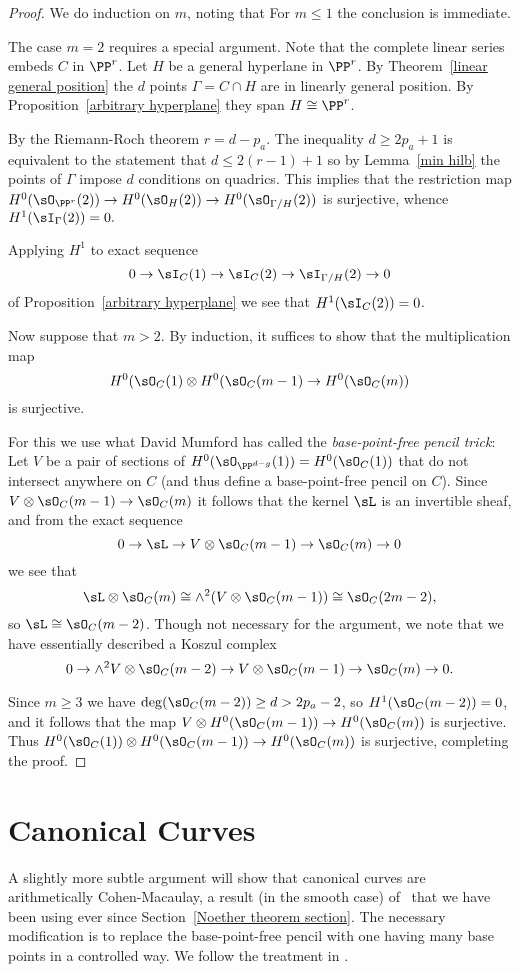 \begin{proof} We do induction on $m$, noting that
For $m\leq 1$ the conclusion is immediate. 

The case $m=2$ requires a special argument. Note that the complete linear series
embeds $C$ in $\PP^{r}$.  Let $H$ be a general hyperlane in $\PP^{r}$.
 By Theorem~\ref{linear general position} the $d$ points $\Gamma = C\cap H$ are in linearly general position. By Proposition~\ref{arbitrary hyperplane} they span $H \cong \PP^{r}$.
 
By the Riemann-Roch theorem $r = d-p_a$. The inequality $d\geq 2p_a+1$ is equivalent to the statement that $d\leq 2(r-1)+1$ so by Lemma~\ref{min hilb} the points of $\Gamma$ impose $d$ conditions on quadrics.
This implies that
the restriction map $H^0(\sO_{\PP^{r}}(2))\to H^0(\sO_H(2)) \to H^0(\sO_{\Gamma/H}(2))$ is surjective, whence $H^1(\sI_\Gamma(2)) = 0.$

Applying $H^1$ to exact sequence 
$$
0\to \sI_C(1) \to \sI_C(2) \to \sI_{\Gamma/H}(2) \to 0
$$
of Proposition~\ref{arbitrary hyperplane}
we see that $H^1(\sI_C(2))=0$.

Now suppose that  $m>2$. By induction, it suffices to show that the multiplication map
$$
H^0(\sO_C(1) \otimes H^0(\sO_C(m-1)\to H^0(\sO_{C}(m))
$$
is surjective.

For this we use what David Mumford has called the \emph{base-point-free pencil trick}:
Let $V$ be a pair of sections of $H^0(\sO_{\PP^{d-g}}(1)) = H^0(\sO_C(1))$ that do not intersect anywhere on $C$ (and thus define a base-point-free pencil on $C$).
Since $V\otimes \sO_{C}(m-1)\to \sO_{C}(m)$ it follows that the kernel $\sL$ is an invertible sheaf,
and from the exact sequence
$$
0\to \sL \to V\otimes \sO_{C}(m-1) \to \sO_{C}(m) \to 0
$$
we see that
$$
\sL \otimes \sO_{C}(m) \cong  \wedge^2(V\otimes \sO_{C}(m-1))\cong \sO_C(2m-2),
$$
so $\sL \cong \sO_C(m-2)$.
Though not necessary for the argument, we note that we have essentially described a Koszul complex
$$
0\to \wedge^2V \otimes \sO_C(m-2) \to V\otimes \sO_{C}(m-1)\to \sO_{C}(m)\to 0.
$$

Since $m\geq 3$ we have $\deg(\sO_C(m-2)) \geq d > 2p_a-2$, so $H^1(\sO_C(m-2)) =0$, and it follows that the map $V\otimes H^0(\sO_{C}(m-1))\to H^0(\sO_{C}(m))$
is surjective. Thus  
$H^0(\sO_C(1))\otimes H^0(\sO_{C}(m-1))\to H^0(\sO_{C}(m))$
is surjective, completing the proof.
\end{proof}


\section{Canonical Curves}\label{canonical ACM}
A slightly more subtle argument will show that
canonical curves are arithmetically Cohen-Macaulay, a result (in the smooth case) of~\cite{Noether-canonical} that we have been using ever since Section~\ref{Noether theorem section}.
The necessary modification is to replace the base-point-free pencil with one having many base points in a controlled way.
We follow the treatment in \cite{Schreyer}. 

